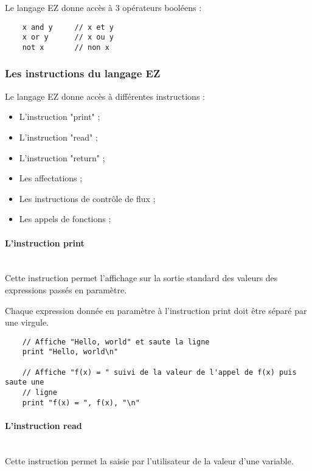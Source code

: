 Le langage EZ donne accès à 3 opérateurs booléens :
\begin{verbatim}
    x and y     // x et y
    x or y      // x ou y
    not x       // non x
\end{verbatim}




\subsubsection{Les instructions du langage EZ}

Le langage EZ donne accès à différentes instructions :
\begin{itemize}
    \item L'instruction "print" ;
    \item L'instruction "read" ;
    \item L'instruction "return" ;
    \item Les affectations ;
    \item Les instructions de contrôle de flux ;
    \item Les appels de fonctions ;
\end{itemize}

\paragraph{L'instruction print}\mbox{} \\

Cette instruction permet l'affichage sur la sortie standard des valeurs
des expressions passés en paramètre.

Chaque expression donnée en paramètre à l'instruction print doit être séparé
par une virgule.

\begin{verbatim}
    // Affiche "Hello, world" et saute la ligne
    print "Hello, world\n"

    // Affiche "f(x) = " suivi de la valeur de l'appel de f(x) puis saute une
    // ligne
    print "f(x) = ", f(x), "\n"
\end{verbatim}


\paragraph{L'instruction read}\mbox{} \\

Cette instruction permet la saisie par l'utilisateur de la valeur d'une
variable.

